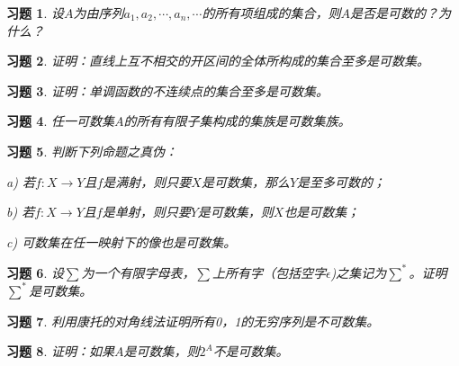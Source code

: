 \documentclass{article}
\begin{document}
\begin{CJK}{UTF8}{gbsn}
\newtheorem{Exercise}{习题}
\begin{Exercise}
设$A$为由序列$a_1,a_2,\cdots,a_n,\cdots$的所有项组成的集合，则$A$是否是可数的？为什么？
\end{Exercise}
\vspace{3cm}
\begin{Exercise}
  证明：直线上互不相交的开区间的全体所构成的集合至多是可数集。
\end{Exercise}
\vspace{3cm}
\begin{Exercise}
  证明：单调函数的不连续点的集合至多是可数集。
\end{Exercise}
\vspace{12cm}
\begin{Exercise}
  任一可数集$A$的所有有限子集构成的集族是可数集族。
\end{Exercise}
\vspace{10cm}
\begin{Exercise}
  判断下列命题之真伪：

 a) 若$f:X\to Y$且$f$是满射，则只要$X$是可数集，那么$Y$是至多可数的；

 b) 若$f:X\to Y$且$f$是单射，则只要$Y$是可数集，则$X$也是可数集；

 c) 可数集在任一映射下的像也是可数集。
\end{Exercise}
\vspace{10cm}
\begin{Exercise}
  设$\sum$为一个有限字母表，$\sum$上所有字（包括空字$\epsilon$)之集记为$\sum^*$。证明$\sum^*$是可数集。
\end{Exercise}
\vspace{10cm}
\begin{Exercise}
  利用康托的对角线法证明所有0，1的无穷序列是不可数集。
\end{Exercise}
\vspace{5cm}
\begin{Exercise}
  证明：如果$A$是可数集，则$2^A$不是可数集。
\end{Exercise}
\end{CJK}
\end{document}
